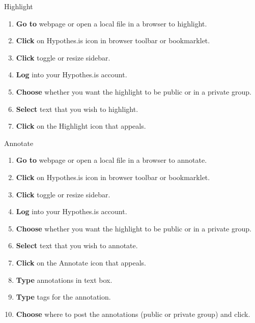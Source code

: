 \documentclass[10pt,a4paper]{article}
\begin{document}
\begin{textbox}{Highlight}
 

  

\begin{enumerate}
\item \textbf{Go to} webpage or open a local file in a browser to highlight. 
\item \textbf{Click} on Hypothes.is icon in browser toolbar or bookmarklet.
\item \textbf{Click} toggle or resize sidebar.
\item \textbf{Log} into your Hypothes.is account.
\item \textbf{Choose} whether you want the highlight to be public or in a private group.
\item \textbf{Select} text that you wish to highlight.
\item \textbf{Click} on the Highlight icon that appeals.

\end{enumerate}

\end{textbox}

\begin{textbox}{Annotate}
 

  

\begin{enumerate}
\item \textbf{Go to} webpage or open a local file in a browser to annotate. 
\item \textbf{Click} on Hypothes.is icon in browser toolbar or bookmarklet.
\item \textbf{Click} toggle or resize sidebar.
\item \textbf{Log} into your Hypothes.is account.
\item \textbf{Choose} whether you want the highlight to be public or in a private group.
\item \textbf{Select} text that you wish to annotate.
\item \textbf{Click} on the Annotate icon that appeals.
\item \textbf{Type} annotations in text box.
\item \textbf{Type} tags for the annotation.
\item \textbf{Choose} where to post the annotations (public or private group) and click. 

\end{enumerate}

\end{textbox}
\end{document}
